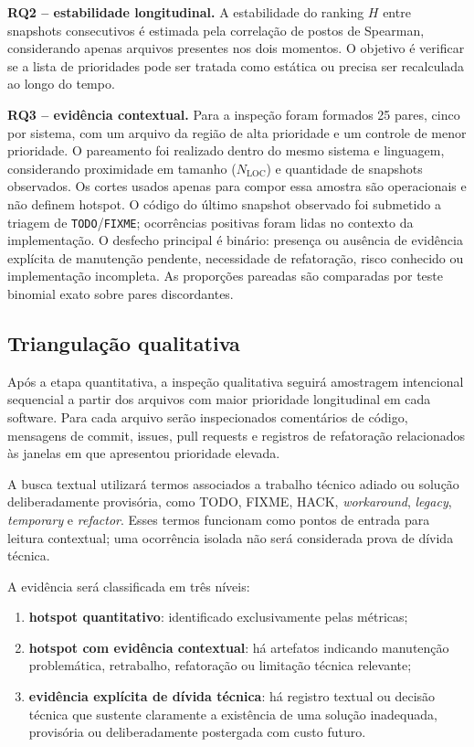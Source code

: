 \documentclass[12pt]{article}
\newcommand{\NLOC}{\ensuremath{N_{\mathrm{LOC}}}}
\begin{document}
\textbf{RQ2 -- estabilidade longitudinal.} A estabilidade do ranking $H$ entre snapshots consecutivos é estimada pela correlação de postos de Spearman, considerando apenas arquivos presentes nos dois momentos. O objetivo é verificar se a lista de prioridades pode ser tratada como estática ou precisa ser recalculada ao longo do tempo.

\textbf{RQ3 -- evidência contextual.} Para a inspeção foram formados 25 pares, cinco por sistema, com um arquivo da região de alta prioridade e um controle de menor prioridade. O pareamento foi realizado dentro do mesmo sistema e linguagem, considerando proximidade em tamanho (\NLOC{}) e quantidade de snapshots observados. Os cortes usados apenas para compor essa amostra são operacionais e não definem hotspot. O código do último snapshot observado foi submetido a triagem de \texttt{TODO}/\texttt{FIXME}; ocorrências positivas foram lidas no contexto da implementação. O desfecho principal é binário: presença ou ausência de evidência explícita de manutenção pendente, necessidade de refatoração, risco conhecido ou implementação incompleta. As proporções pareadas são comparadas por teste binomial exato sobre pares discordantes.

\subsection{Triangulação qualitativa}

Após a etapa quantitativa, a inspeção qualitativa seguirá amostragem intencional sequencial a partir dos arquivos com maior prioridade longitudinal em cada software. Para cada arquivo serão inspecionados comentários de código, mensagens de commit, issues, pull requests e registros de refatoração relacionados às janelas em que apresentou prioridade elevada.

A busca textual utilizará termos associados a trabalho técnico adiado ou solução deliberadamente provisória, como TODO, FIXME, HACK, \emph{workaround}, \emph{legacy}, \emph{temporary} e \emph{refactor}. Esses termos funcionam como pontos de entrada para leitura contextual; uma ocorrência isolada não será considerada prova de dívida técnica.

A evidência será classificada em três níveis:

\begin{enumerate}[noitemsep]
    \item \textbf{hotspot quantitativo}: identificado exclusivamente pelas métricas;
    \item \textbf{hotspot com evidência contextual}: há artefatos indicando manutenção problemática, retrabalho, refatoração ou limitação técnica relevante;
    \item \textbf{evidência explícita de dívida técnica}: há registro textual ou decisão técnica que sustente claramente a existência de uma solução inadequada, provisória ou deliberadamente postergada com custo futuro.
\end{enumerate}
\end{document}
